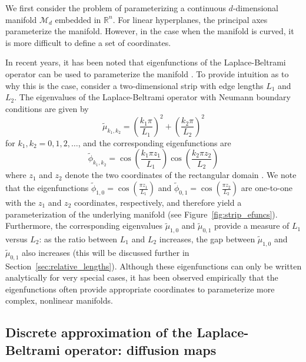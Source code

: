 \documentclass[preprint]{elsarticle}
\begin{document}
We first consider the problem of parameterizing a continuous $d$-dimensional manifold $\mathcal{M}_d$ embedded in $\mathbb{R}^n$.
%
For linear hyperplanes,  the principal axes parameterize the manifold.
%
However, in the case when the manifold is curved, it is more difficult to define a set of coordinates. 

In recent years, it has been noted that eigenfunctions of the Laplace-Beltrami operator can be used to parameterize the manifold \cite{Belkin2003, coifman2005geometric, singer2008non}. 
%
To provide intuition as to why this is the case, consider a two-dimensional strip with edge lengths $L_1$ and $L_2$. 
%
The eigenvalues of the Laplace-Beltrami operator with Neumann boundary conditions are given by
\begin{equation} \label{eq:evals}
\tilde{\mu}_{k_1, k_2} = \left( \frac{k_1 \pi}{L_1} \right)^2 + \left( \frac{k_2 \pi}{L_2} \right)^2
\end{equation}
for $k_1, k_2 = 0, 1, 2, \dots$,
and the corresponding eigenfunctions are 
\begin{equation} \label{eq:efuncs}
\tilde{\phi}_{k_1, k_2} = \cos \left( \frac{k_1 \pi z_1}{L_1} \right) \cos \left( \frac{k_2 \pi z_2}{L_2} \right)
\end{equation}
where $z_1$ and $z_2$ denote the two coordinates of the rectangular domain \cite{singer2008non}. 
%
We note that the eigenfunctions $\tilde{\phi}_{1, 0} = \cos \left( \frac{\pi z_1}{L_1} \right)$ and $\tilde{\phi}_{0, 1} = \cos \left( \frac{\pi z_2}{L_2} \right)$ are one-to-one with the $z_1$ and $z_2$ coordinates, respectively, and therefore yield a parameterization of the underlying manifold (see Figure~\ref{fig:strip_efuncs}). 
%
Furthermore, the corresponding eigenvalues $\tilde{\mu}_{1,0}$ and $\tilde{\mu}_{0,1}$ provide a measure of $L_1$ versus $L_2$: as the ratio between $L_1$ and $L_2$ increases, the gap between $\tilde{\mu}_{1,0}$ and $\tilde{\mu}_{0,1}$ also increases (this will be discussed further in Section~\ref{sec:relative_lengths}).
%
Although these eigenfunctions can only be written analytically for very special cases, it has been observed empirically that the eigenfunctions often provide appropriate coordinates to parameterize more complex, nonlinear manifolds. 

 


\subsection{Discrete approximation of the Laplace-Beltrami operator: diffusion maps}
\end{document}
